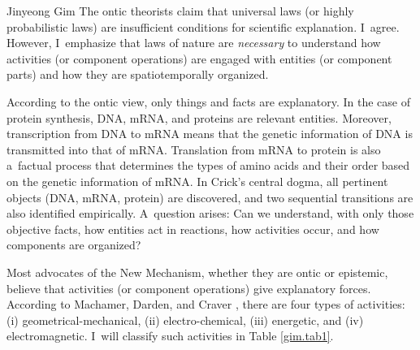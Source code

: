 \begin{artengenv}{Jinyeong Gim}
The ontic theorists claim that universal laws (or highly probabilistic laws) are insufficient conditions for scientific explanation. I~agree. However, I~emphasize that laws of nature are \textit{necessary} to understand how activities (or component operations) are engaged with entities (or component parts) and how they are spatiotemporally organized.

According to the ontic view, only things and facts are explanatory. In the case of protein synthesis, DNA, mRNA, and proteins are relevant entities. Moreover, transcription from DNA to mRNA means that the genetic information of DNA is transmitted into that of mRNA. Translation from mRNA to protein is also a~factual process that determines the types of amino acids and their order based on the genetic information of mRNA. In Crick's central dogma, all pertinent objects (DNA, mRNA, protein) are discovered, and two sequential transitions are also identified empirically. A~question arises: Can we understand, with only those objective facts, how entities act in reactions, how activities occur, and how components are organized?

Most advocates of the New Mechanism, whether they are ontic or epistemic, believe that activities (or component operations) give explanatory forces. According to Machamer, Darden, and Craver
\parencite*[][p.14]{machamer_thinking_2000}, %
 there are four types of activities: (i) geometrical-mechanical, (ii) electro-chemical, (iii) energetic, and (iv) electromagnetic. I~will classify such activities in Table \ref{gim.tab1}.


\begin{table}[]
\caption{Types of activities.}
\label{gim.tab1}
\end{table}


\end{artengenv}
